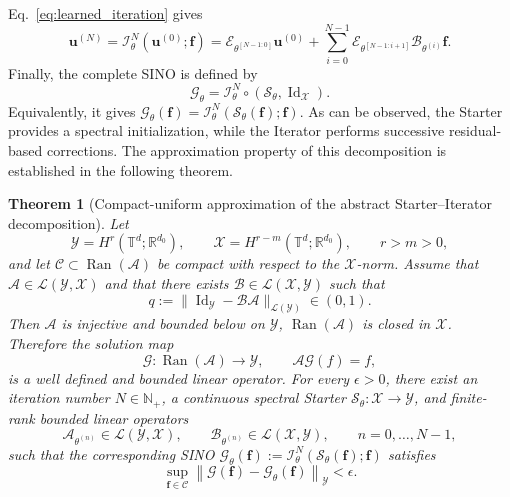 \documentclass[preprint,numbers,sort&compress]{elsarticle}
\newtheorem{theorem}{Theorem}
\begin{document}
		Eq.~\eqref{eq:learned_iteration} gives 
		\begin{equation}
			\label{eq:iterator}
			\boldsymbol u^{(N)}
			=
			\mathcal I_\theta^N
			\left(
			\boldsymbol u^{(0)};\boldsymbol f
			\right)=
			\mathcal E_{\theta^{[N-1:0]}}
			\boldsymbol u^{(0)}
			+
			\sum_{i=0}^{N-1}
			\mathcal E_{\theta^{[N-1:i+1]}}
			\mathcal B_{\theta^{(i)}}\boldsymbol f.
		\end{equation}
		Finally, the complete SINO is defined by
		\begin{equation}
			\label{sino_form}
			\mathcal G_\theta
			=
			\mathcal I_\theta^N
			\circ
			\left(
			\mathcal S_\theta,
			\operatorname{Id}_{\mathcal X}
			\right).
		\end{equation}
		Equivalently, it gives $\mathcal G_\theta(\boldsymbol f)
		=\mathcal I_\theta^N\left(\mathcal S_\theta(\boldsymbol f);
		\boldsymbol f \right)$. 
		As can be observed, the Starter provides a spectral initialization, while the Iterator performs successive residual-based corrections. The approximation property of this decomposition is established in the following theorem.
		
		
		
		
		\begin{theorem}[Compact-uniform approximation of the abstract Starter–Iterator decomposition]
			\label{thm:fsno_approx}
			Let
			\[
			\mathcal Y=H^r(\mathbb T^d;\mathbb R^{d_{0}}),
			\qquad
			\mathcal X=H^{r-m}(\mathbb T^d;\mathbb R^{d_{0}}),
			\qquad r>m>0,
			\]
			and let $\mathcal C\subset \operatorname{Ran}(\mathcal A)$
			be compact with respect to the \(\mathcal X\)-norm. Assume that $\mathcal A\in\mathcal L(\mathcal Y,\mathcal X)$
			and that there exists
			$\mathcal B\in\mathcal L(\mathcal X,\mathcal Y)$
			such that
			\[
			q:=\|\operatorname{Id}_{\mathcal Y}-\mathcal B\mathcal A\|_
			{\mathcal L(\mathcal Y)} \in (0, 1).
			\]
			Then $\mathcal A$ is injective and bounded below on $\mathcal Y$, $\operatorname{Ran}(\mathcal A)$ is closed in $\mathcal X$.
			Therefore the solution map
			\[
			\mathcal G: \operatorname{Ran}(\mathcal A)\to\mathcal Y,
			\qquad
			\mathcal A\mathcal G(f)=f,
			\]
			is a well defined and bounded linear operator. For every $\epsilon>0$, there exist an iteration number $N\in\mathbb N_+$, a continuous spectral Starter
			$\mathcal S_\theta:\mathcal X\to\mathcal Y$, and finite-rank bounded
			linear operators
			\[
			\mathcal A_{\theta^{(n)}}\in\mathcal L(\mathcal Y,\mathcal X),
			\qquad
			\mathcal B_{\theta^{(n)}}\in\mathcal L(\mathcal X,\mathcal Y),
			\qquad
			n=0,\ldots,N-1,
			\]
			such that the corresponding SINO $\mathcal G_\theta(\boldsymbol f)
			:= \mathcal I_\theta^N
			\left(\mathcal S_\theta(\boldsymbol f);
			\boldsymbol f\right)$ satisfies
			\[
			\sup_{\boldsymbol f\in\mathcal C}
			\left\|
			\mathcal G(\boldsymbol f)
			-
			\mathcal G_\theta(\boldsymbol f)
			\right\|_{\mathcal Y}
			<\epsilon.
			\]
		\end{theorem}
		
\end{document}
